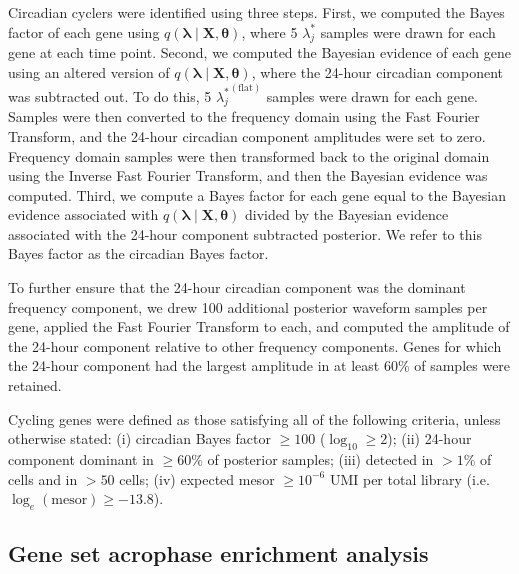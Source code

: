 \documentclass[12pt]{article}
\begin{document}
Circadian cyclers were identified using three steps. First, we computed the Bayes factor
of each gene using $q\!\left( \boldsymbol{\lambda} \mid \mathbf{X}, \boldsymbol{\theta} \right)$,
where 5 $\lambda_{j}^{*}$ samples were drawn for each gene at each time point. Second, we computed
the Bayesian evidence of each gene using an altered version of $q\!\left( \boldsymbol{\lambda} \mid
\mathbf{X}, \boldsymbol{\theta} \right)$, where the 24-hour circadian component was subtracted out.
To do this, 5 ${\lambda_{j}^{*}}^{(\text{flat})}$ samples were drawn for each gene. Samples were
then converted to the frequency domain using the Fast Fourier Transform, and the 24-hour circadian
component amplitudes were set to zero. Frequency domain samples were then transformed back to the
original domain using the Inverse Fast Fourier Transform, and then the Bayesian evidence was
computed. Third, we compute a Bayes factor for each gene equal to the Bayesian evidence associated
with $q\!\left( \boldsymbol{\lambda} \mid \mathbf{X}, \boldsymbol{\theta} \right)$ divided by the
Bayesian evidence associated with the 24-hour component subtracted posterior. We refer to this Bayes
factor as the circadian Bayes factor.

To further ensure that the 24-hour circadian component was the dominant frequency component, we drew
100 additional posterior waveform samples per gene, applied the Fast Fourier Transform to each, and
computed the amplitude of the 24-hour component relative to other frequency components. Genes for
which the 24-hour component had the largest amplitude in at least 60\% of samples were retained.

Cycling genes were defined as those satisfying all of the following criteria, unless otherwise stated:
(i) circadian Bayes factor $\geq 100$ ($\log_{10} \geq 2$);
(ii) 24-hour component dominant in $\geq 60\%$ of posterior samples;
(iii) detected in $> 1\%$ of cells and in $> 50$ cells;
(iv) expected mesor $\geq 10^{-6}$ UMI per total library (i.e.\ $\log_{e}(\text{mesor}) \geq -13.8$).

\subsection*{Gene set acrophase enrichment analysis}
\end{document}
